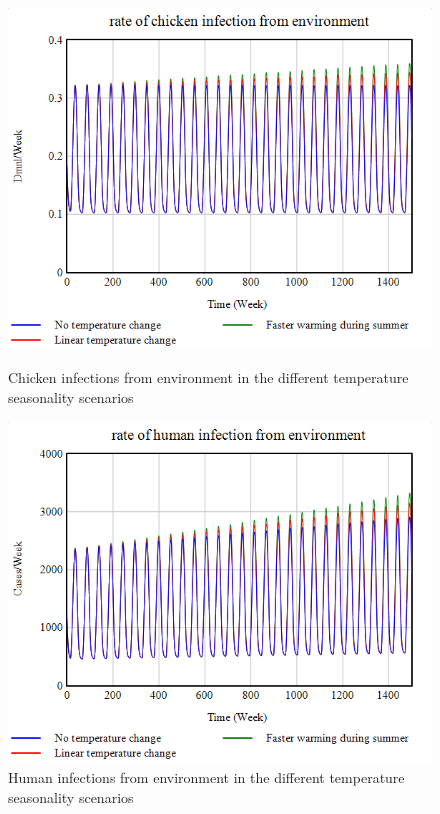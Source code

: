 \begin{figure}[h!]
    \centering
    \begin{minipage}{0.45\textwidth}
        \centering
        \includegraphics[width=1\textwidth]{images/sensitivity/Seasonal temperature chicken infection.png}
        \caption{Chicken infections from environment in the different temperature seasonality scenarios}
        \label{fig:season_chicken}
    \end{minipage}
    \begin{minipage}{0.45\textwidth}
        \centering
        \includegraphics[width=1\textwidth]{images/sensitivity/Seasonal temperature human infection.png}
        \caption{Human infections from environment in the different temperature seasonality scenarios}
        \label{fig:season_human}
    \end{minipage}
\end{figure}

